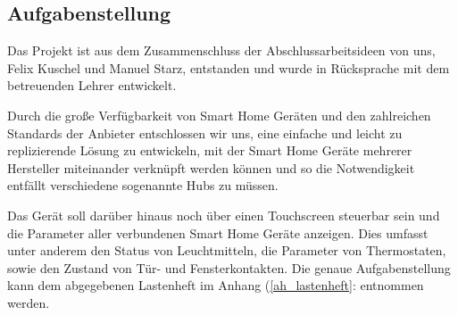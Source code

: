 \subsection{Aufgabenstellung}\label{vw_aufgabenstellung}
Das Projekt ist aus dem Zusammenschluss der Abschlussarbeitsideen von uns, Felix Kuschel und Manuel Starz, entstanden und wurde in Rücksprache mit dem betreuenden Lehrer entwickelt.\par
\noindent Durch die große Verfügbarkeit von Smart Home Geräten und den zahlreichen Standards der Anbieter entschlossen wir uns, eine einfache und leicht zu replizierende Lösung zu entwickeln, mit der Smart Home Geräte mehrerer Hersteller miteinander verknüpft werden können und so die Notwendigkeit entfällt verschiedene sogenannte Hubs zu müssen.\par
\noindent Das Gerät soll darüber hinaus noch über einen Touchscreen steuerbar sein und die Parameter aller verbundenen Smart Home Geräte anzeigen.
Dies umfasst unter anderem den Status von Leuchtmitteln, die Parameter von Thermostaten, sowie den Zustand von Tür- und Fensterkontakten. 
Die genaue Aufgabenstellung kann dem abgegebenen Lastenheft im Anhang (\ref{ah_lastenheft}:  entnommen werden.